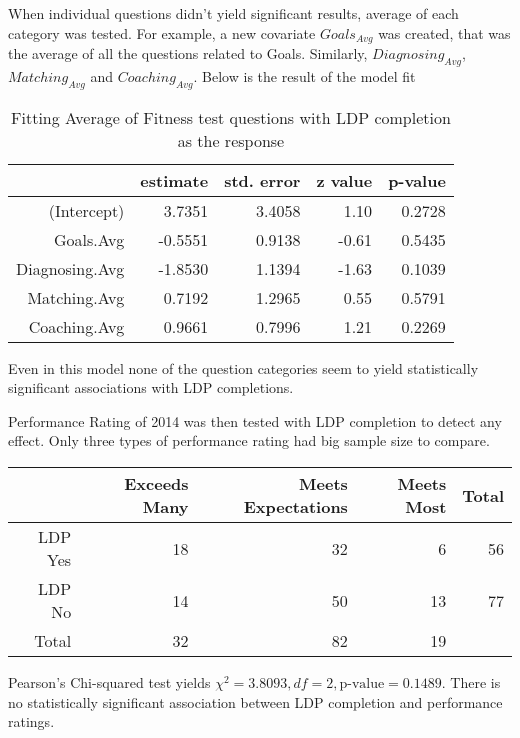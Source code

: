 \documentclass[11pt]{extarticle} %
\begin{document}
When individual questions didn't yield significant results, average of each category was tested. For example, a new covariate $Goals_{Avg}$ was created, that was the average of all the questions related to Goals. Similarly, $Diagnosing_{Avg}$, $Matching_{Avg}$ and $Coaching_{Avg}$. Below is the result of the model fit
\begin{table}[H]
\centering
\begin{tabular}{rrrrr}
  \hline
 & estimate & std. error & z value & p-value \\ 
  \hline
(Intercept) & 3.7351 & 3.4058 & 1.10 & 0.2728 \\ 
  Goals.Avg & -0.5551 & 0.9138 & -0.61 & 0.5435 \\ 
  Diagnosing.Avg & -1.8530 & 1.1394 & -1.63 & 0.1039 \\ 
  Matching.Avg & 0.7192 & 1.2965 & 0.55 & 0.5791 \\ 
  Coaching.Avg & 0.9661 & 0.7996 & 1.21 & 0.2269 \\ 
   \hline
\end{tabular}
\caption{Fitting Average of Fitness test questions with LDP completion as the response}
\end{table}

Even in this model none of the question categories seem to yield statistically significant associations with LDP completions. 

Performance Rating of 2014 was then tested with LDP completion to detect any effect. Only three types of performance rating had big sample size to compare. 
\begin{table}[H]
\centering
\begin{tabular}{rrrrr}
 \hline
 & Exceeds Many & Meets Expectations & Meets Most & Total\\ 
 \hline
 LDP Yes &  18 &  32 &   6 & 56\\ 
 LDP No &  14 &  50 &  13 & 77\\ 
 \hline
 Total & 32 & 82 & 19 & \\
 \hline
\end{tabular}
\end{table}
Pearson's Chi-squared test yields $\chi^2 = 3.8093, df = 2, \text{p-value} = 0.1489$. There is no statistically significant association between LDP completion and performance ratings. 
\end{document}
